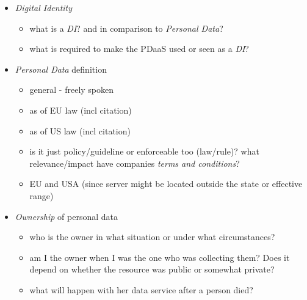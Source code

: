 \documentclass[12pt,english,a4paper,titlepage,cleardoublepage=empty,dottedtoc]{report}
\providecommand{\tightlist}{%
  \setlength{\itemsep}{0pt}\setlength{\parskip}{0pt}}
\begin{document}
\begin{itemize}
\tightlist
\item
  \emph{Digital Identity}

  \begin{itemize}
  \tightlist
  \item
    what is a \emph{DI}? and in comparison to \emph{Personal Data}?
  \item
    what is required to make the PDaaS used or seen as a \emph{DI}?
  \end{itemize}
\item
  \emph{Personal Data} definition

  \begin{itemize}
  \tightlist
  \item
    general - freely spoken
  \item
    as of EU law (incl citation)
  \item
    as of US law (incl citation)
  \item
    is it just policy/guideline or enforceable too (law/rule)? what
    relevance/impact have companies \emph{terms and conditions}?
  \item
    EU and USA (since server might be located outside the state or
    effective range)
  \end{itemize}
\item
  \emph{Ownership} of personal data

  \begin{itemize}
  \tightlist
  \item
    who is the owner in what situation or under what circumstances?
  \item
    am I the owner when I was the one who was collecting them? Does it
    depend on whether the resource was public or somewhat private?
  \item
    what will happen with her data service after a person died?
  \end{itemize}
\end{itemize}
\end{document}
